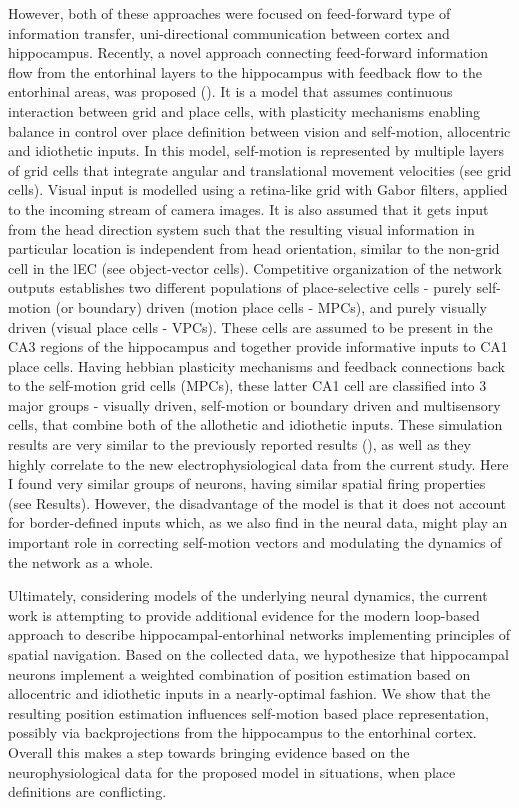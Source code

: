 However, both of these approaches were focused on feed-forward type of information transfer, uni-directional communication between cortex and hippocampus. Recently, a novel approach connecting feed-forward information flow from the entorhinal layers to the hippocampus with feedback flow to the entorhinal areas, was proposed (\cite{Li2020}). It is a model that assumes continuous interaction between grid and place cells, with plasticity mechanisms enabling balance in control over place definition between vision and self-motion, allocentric and idiothetic inputs. In this model, self-motion is represented by multiple layers of grid cells that integrate angular and translational movement velocities (see grid cells). Visual input is modelled using a retina-like grid with Gabor filters, applied to the incoming stream of camera images. It is also assumed that it gets input from the head direction system such that the resulting visual information in particular location is independent from head orientation, similar to the non-grid cell in the lEC (see object-vector cells). Competitive organization of the network outputs establishes two different populations of place-selective cells - purely self-motion (or boundary) driven (motion place cells - MPCs), and purely visually driven (visual place cells - VPCs). These cells are assumed to be present in the CA3 regions of the hippocampus and together provide informative inputs to CA1 place cells. Having hebbian plasticity mechanisms and feedback connections back to the self-motion grid cells (MPCs), these latter CA1 cell are classified into 3 major groups - visually driven, self-motion or boundary driven and multisensory cells, that combine both of the allothetic and idiothetic inputs. These simulation results are very similar to the previously reported results (\cite{Haas2019}), as well as they highly correlate to the new electrophysiological data from the current study. Here I found very similar groups of neurons, having similar spatial firing properties (see Results). However, the disadvantage of the model is that it does not account for border-defined inputs which, as we also find in the neural data, might play an important role in correcting self-motion vectors and modulating the dynamics of the network as a whole.

Ultimately, considering models of the underlying neural dynamics, the current work is attempting to provide additional evidence for the modern loop-based approach to describe hippocampal-entorhinal networks implementing principles of spatial navigation. Based on the collected data, we hypothesize that hippocampal neurons implement a weighted combination of position estimation based on allocentric and idiothetic inputs in a nearly-optimal fashion. We show that the resulting position estimation influences self-motion based place representation, possibly via backprojections from the hippocampus to the entorhinal cortex. Overall this makes a step towards bringing evidence based on the neurophysiological data for the proposed model in situations, when place definitions are conflicting.


